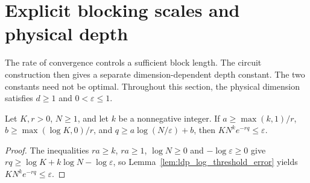 \section{Explicit blocking scales and physical depth}

The rate of convergence controls a sufficient block length. The circuit
construction then gives a separate dimension-dependent depth constant.
The two constants need not be optimal. Throughout this section, the
physical dimension satisfies $d\ge1$ and $0<\varepsilon\le1$.

\begin{lemma}
    \label{thm:ldp_polynomial_exponential_scale}
    \leanok
    Let $K,r>0$, $N\ge1$, and let $k$ be a nonnegative integer. If
    $a\ge\max(k,1)/r$, $b\ge\max(\log K,0)/r$, and
    $q\ge a\log(N/\varepsilon)+b$, then $KN^ke^{-rq}\le\varepsilon$.
\end{lemma}
\begin{proof}
    \leanok
    The inequalities $ra\ge k$, $ra\ge1$, $\log N\ge0$ and
    $-\log\varepsilon\ge0$ give
    $rq\ge\log K+k\log N-\log\varepsilon$, so
    Lemma~\ref{lem:ldp_log_threshold_error} yields $KN^ke^{-rq}\le\varepsilon$.
\end{proof}

